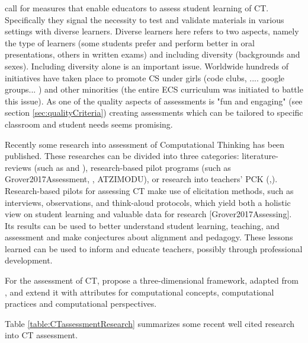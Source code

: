  call for measures that enable educators to assess student learning of CT. Specifically they signal the necessity to test and validate materials in various settings with diverse learners. Diverse learners here refers to two aspects, namely the type of learners (some students prefer and perform better in oral presentations, others in written exams) and including diversity (backgrounds and sexes). Including diversity alone is an important issue. Worldwide hundreds of initiatives have taken place to promote CS under girls (code clubs, .... google groups... ) and other minorities (the entire ECS curriculum was initiated to battle this issue). As one of the quality aspects of assessments is "fun and engaging" (see section \ref{sec:qualityCriteria}) creating assessments which can be tailored to specific classroom and student needs seems promising.

Recently some research into assessment of Computational Thinking has been published. These researches can be divided into three categories: literature-reviews (such as \cite{GroverPea2013} and \cite{crick2017}), research-based pilot programs (such as Grover2017Assessment, \cite{snow2017CTECD}, ATZIMODU), or research into teachers' PCK (\cite{Yadav2017CTteacherEd},\cite{Yadav2016}). Research-based pilots for assessing CT make use of elicitation methods, such as interviews, observations, and think-aloud protocols, which yield both a holistic view on student learning and valuable data for research [Grover2017Assessing]. Its results can be used to better understand student learning, teaching, and assessment and make conjectures about alignment and pedagogy. These lessons learned can be used to inform and educate teachers, possibly through professional development.


For the assessment of CT,  propose a three-dimensional framework, adapted from , and extend it with attributes for computational concepts, computational practices and computational perspectives.

Table \ref{table:CTassessmentResearch} summarizes some recent well cited research into CT assessment.



